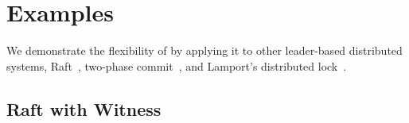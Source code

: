 \section{Examples}
\label{chapter:witnesspassing:sec:examples}


We demonstrate the flexibility of \sysname{} by applying it to other leader-based distributed systems, Raft~\cite{raft}, two-phase commit~\cite{distsys}, and Lamport's distributed
lock~\cite{lamportclock}.

\subsection{Raft with Witness}
\label{chapter:witnesspassing:subsec:raft-with-witness}

